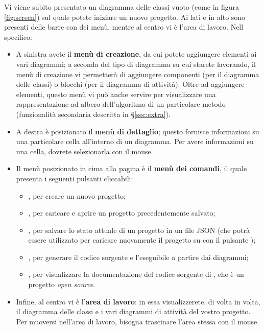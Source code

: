 Vi viene subito presentato un diagramma delle classi vuoto (come in figura \ref{fig:screen}) sul quale potete iniziare un nuovo progetto. Ai lati e in alto sono presenti delle barre con dei menù, mentre al centro vi è l'area di lavoro. Nell specifico:
\begin{itemize}
	\item A sinistra avete il \textbf{menù di creazione}, da cui potete aggiungere elementi ai vari diagrammi; a seconda del tipo di diagramma su cui starete lavorando, il menù di creazione vi permetterà di aggiungere componenti (per il diagramma delle classi) o blocchi (per il diagramma di attività). Oltre ad aggiungere elementi, questo menù vi può anche servire per visualizzare una rappresentazione ad albero dell'algoritmo di un particolare metodo (funzionalità secondaria descritta in §\ref{sec:extra}).
	\item A destra è posizionato il \textbf{menù di dettaglio}; questo fornisce informazioni su una particolare cella all'interno di un diagramma. Per avere informazioni su una cella, dovrete selezionarla con il mouse.
	\item Il menù posizionato in cima alla pagina è il \textbf{menù dei comandi}, il quale presenta i seguenti pulsanti cliccabili:
	\begin{itemize}
		\item {}, per creare un nuovo progetto;
		\item {}, per caricare e aprire un progetto precedentemente salvato;
		\item {}, per salvare lo stato attuale di un progetto in un file JSON (che potrà essere utilizzato per caricare nuovamente il progetto su \proj{} con il pulsante );
		\item {}, per generare il codice sorgente e l'eseguibile a partire dai diagrammi;
		\item {}, per visualizzare la documentazione del codice sorgente di \proj, che è un progetto \emph{open source}.
	\end{itemize}
	\item Infine, al centro vi è l'\textbf{area di lavoro}: in essa visualizzerete, di volta in volta, il diagramma delle classi e i vari diagrammi di attività del vostro progetto. Per muoversi nell'area di lavoro, bisogna trascinare l'area stessa con il mouse.
\end{itemize}

